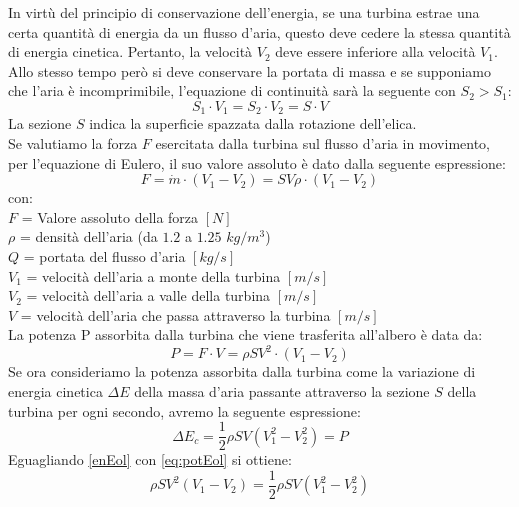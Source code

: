 In virtù del principio di conservazione dell'energia, se una turbina estrae una certa quantità di energia da un flusso d'aria, questo deve cedere la stessa quantità di energia cinetica. Pertanto, la velocità $V_2$ deve essere inferiore alla velocità $V_1$. Allo stesso tempo però si deve conservare la portata di massa e se supponiamo che l'aria è incomprimibile, l'equazione di continuità sarà la seguente con $S_2>S_1$:
\begin{equation}
S_1 \cdot V_1 = S_2 \cdot V_2 = S \cdot V
\end{equation}
La sezione $S$ indica la superficie spazzata dalla rotazione dell'elica.\\
Se valutiamo la forza $F$ esercitata dalla turbina sul flusso d'aria in movimento, per l'equazione di Eulero, il suo valore assoluto è dato dalla seguente espressione:
\begin{equation}
F = \dot{m} \cdot \left( V_1 - V_2 \right) = S V \rho \cdot \left( V_1 - V_2 \right)
\end{equation}
con:\\
$F$ = Valore assoluto della forza $[N]$\\
$\rho$ = densità dell'aria (da $1.2$ a $1.25$ $kg/m^3$)\\
$Q$ = portata del flusso d'aria $[kg/s]$\\
$V_1$ = velocità dell'aria a monte della turbina $[m/s]$\\
$V_2$ = velocità dell'aria a valle della turbina $[m/s]$\\
$V$ = velocità dell'aria che passa attraverso la turbina $[m/s]$\\[2mm]
La potenza P assorbita dalla turbina che viene trasferita all'albero è data da:
\begin{equation}\label{eq:potEol}
P = F \cdot V = \rho S V^2 \cdot \left( V_1 - V_2 \right)
\end{equation}
Se ora consideriamo la potenza assorbita dalla turbina come la variazione di energia cinetica $\Delta E$ della massa d'aria passante attraverso la sezione $S$ della turbina per ogni secondo, avremo la seguente espressione:
\begin{equation}\label{enEol}
\Delta E_c = \frac{1}{2} \rho	S V \left(V_1^2 - V_2^2 \right) = P
\end{equation}
Eguagliando \ref{enEol} con \ref{eq:potEol} si ottiene:
\begin{equation}
\rho S V^2 \left(V_1 - V_2 \right) = \frac{1}{2} \rho S V \left(V_1^2-V_2^2 \right)
\label{eq:P_a2}
\end{equation}
